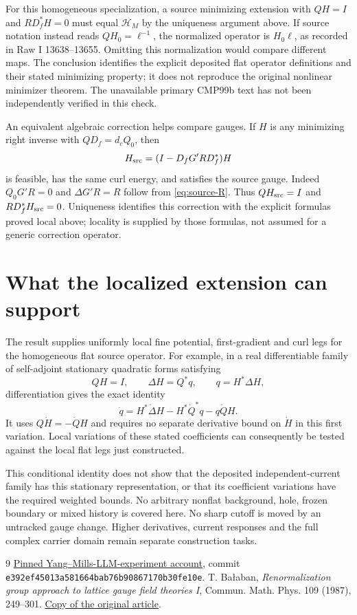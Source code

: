 \documentclass[11pt]{article}
\theoremstyle{remark}
\newcommand{\HH}{\mathcal H}
\begin{document}
For this homogeneous specialization, a source minimizing extension
with $QH=I$ and $RD_f^*H=0$ must equal $\HH_M$ by the uniqueness
argument above. If source notation instead reads $QH_0=\ell^{-1}$,
the normalized operator is $H_0\ell$, as recorded in Raw I
13638--13655. Omitting this normalization would compare different
maps. The conclusion identifies the explicit deposited flat
operator definitions and their stated minimizing property; it
does not reproduce the original nonlinear minimizer theorem.
The unavailable primary CMP99b text has not been independently
verified in this check.

An equivalent algebraic correction helps compare gauges. If $H$
is any minimizing right inverse with $QD_f=d_cQ_0$, then
\[
 H_{\rm src}=(I-D_fG'RD_f^*)H
\]
is feasible, has the same curl energy, and satisfies the source
gauge. Indeed $Q_0G'R=0$ and $\Delta G'R=R$ follow from
\eqref{eq:source-R}. Thus $QH_{\rm src}=I$ and
$RD_f^*H_{\rm src}=0$. Uniqueness identifies this correction
with the explicit formulas proved local above; locality is supplied
by those formulas, not assumed for a generic correction operator.

\section{What the localized extension can support}

The result supplies uniformly local fine potential, first-gradient
and curl legs for the homogeneous flat source operator. For example,
in a real differentiable family of self-adjoint stationary quadratic
forms satisfying
\[
 QH=I,\qquad \Delta H=Q^*q,\qquad q=H^*\Delta H,
\]
differentiation gives the exact identity
\[
 \dot q=H^*\dot\Delta H-H^*\dot Q^*q-q\dot QH.
\]
It uses $Q\dot H=-\dot QH$ and requires no separate derivative
bound on $\dot H$ in this first variation. Local variations of
these stated coefficients can consequently be tested against the
local flat legs just constructed.

This conditional identity does not show that the deposited
independent-current family has this stationary representation, or
that its coefficient variations have the required weighted bounds.
No arbitrary nonflat background, hole, frozen boundary or mixed
history is covered here. No sharp cutoff is moved by an untracked
gauge change. Higher derivatives, current responses and the full
complex carrier domain remain separate construction tasks.

\begin{thebibliography}{9}
\href{https://github.com/ethanwsussman/Yang--Mills-LLM-experiment/tree/e392ef45013a581664bab76b90867170b30fe10e}
{Pinned Yang--Mills-LLM-experiment account}, commit
\texttt{e392ef45013a581664bab76b90867170b30fe10e}.
 T. Ba\l aban,
\emph{Renormalization group approach to lattice gauge field theories I},
Commun. Math. Phys. 109 (1987), 249--301.
\href{https://scispace.com/pdf/renormalization-group-approach-to-lattice-gauge-field-3ygai0vxt1.pdf}
{Copy of the original article}.
\end{thebibliography}
\end{document}
